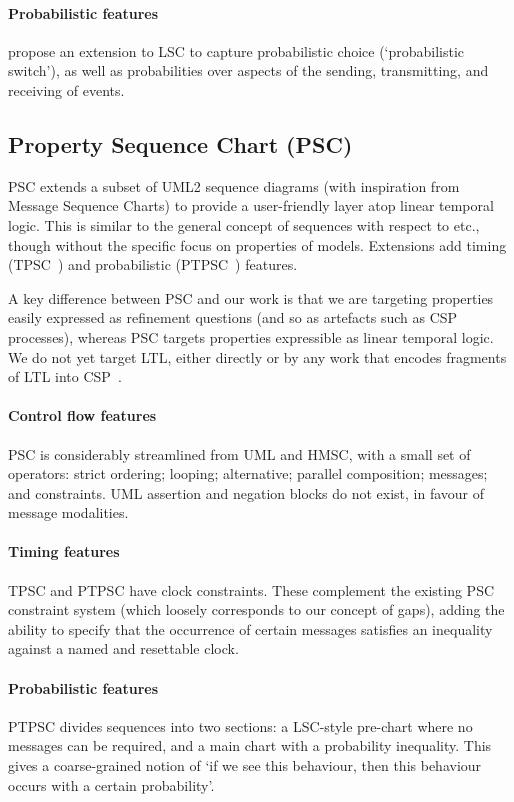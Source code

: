 \paragraph{Probabilistic features}
\textcite{Kai14-PLSC} propose an extension to LSC to capture
probabilistic choice (`probabilistic switch'), as well as
probabilities over aspects of the sending, transmitting, and receiving
of events.

\subsection{Property Sequence Chart (PSC)}

PSC extends a subset of UML2 sequence diagrams (with inspiration from
Message Sequence Charts) to provide a
user-friendly layer atop linear temporal logic.  This is
similar to the general concept of \langname{} sequences with respect to \tockcsp{}
etc., though without the
specific focus on properties of \robochart{} models.
Extensions add timing (TPSC~\cite{tpsc}) and
probabilistic (PTPSC~\cite{ptpsc}) features.

A key difference between PSC and our work is that we are
targeting  properties easily expressed as refinement questions
(and so as artefacts such as CSP processes), whereas PSC targets properties
expressible as linear temporal logic.  We do not yet target LTL,
either directly or by any work that encodes fragments of LTL into
CSP~\cite{fdrspin,Lowe08-CommunicatingProcessSpecification}.

\paragraph{Control flow features}
PSC is considerably streamlined from UML and HMSC, with a small set of operators: strict
ordering; looping; alternative; parallel composition; messages; and constraints.
UML assertion and negation blocks do not exist, in favour of message modalities.

\paragraph{Timing features}
TPSC and PTPSC have clock constraints.  These complement the existing PSC constraint system
(which loosely corresponds to our concept of gaps), adding the ability to
specify that the occurrence of certain messages satisfies an inequality against
a named and resettable clock.

\paragraph{Probabilistic features}
PTPSC divides sequences into two sections: a LSC-style pre-chart where no messages can be required,
and a main chart with a probability inequality.  This gives a coarse-grained notion of `if we see
this behaviour, then this behaviour occurs with a certain probability'.

